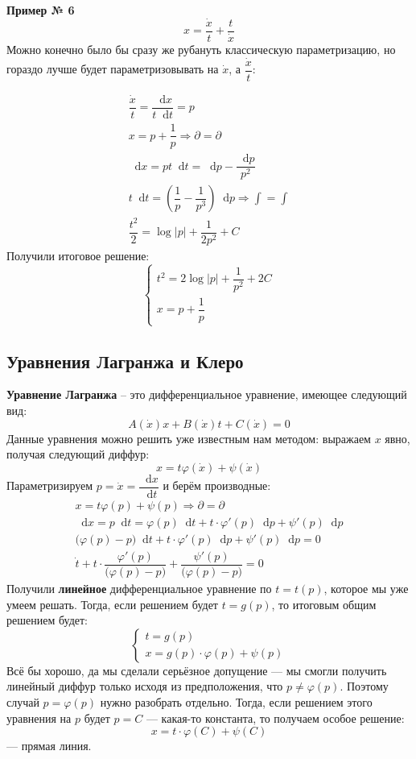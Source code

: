 \documentclass[a4paper,12pt]{article}
\renewcommand*\d{\mathop{}\!\mathrm{d}}
\newcommand{\dt}{\dot{t}}
\newcommand{\dx}{\dot{x}}
\newcommand{\fe}{\varphi}
\newcommand{\bto}{\Longrightarrow}
\newcommand{\ds}{\displaystyle}
\begin{document}
\textbf{Пример № 6}
\[x = \dfrac{\dx}{t} + \dfrac{t}{\dx}\]
Можно конечно было бы сразу же рубануть классическую параметризацию, но гораздо лучше будет параметризовывать на $\dx$, а $\dfrac{\dx }{t}$:

\begin{gather*}
	\dfrac{\dx}{t} = \dfrac{\d x}{t\d t} = p \\
	x = p + \dfrac{1}{p} \bto \partial = \partial\\
	\d x = pt\d t = \d p - \dfrac{\d p}{p^2}\\
	t\d t = \left(\dfrac{1}{p} - \dfrac{1}{p^3}\right)\d p \bto \ds\int = \int\\
	\dfrac{t^2}{2} = \log|p| + \dfrac{1}{2p^2} + C
\end{gather*}
Получили итоговое решение:
\[\begin{cases}t^2 = 2\log|p| + \dfrac{1}{p^2} + 2C\\ x = p + \dfrac{1}{p}\end{cases}\]

\subsection{Уравнения Лагранжа и Клеро}

\textbf{Уравнение Лагранжа} -- это дифференциальное уравнение, имеющее следующий вид:
\[A(\dx)x + B(\dx)t + C(\dx) = 0\]
Данные уравнения можно решить уже известным нам методом: выражаем $x$ явно, получая следующий диффур:
\[x = t \fe(\dx) + \psi(\dx)\]
Параметризируем $p = \dx = \dfrac{\d x}{\d t}$ и берём производные:
\begin{gather*}
x = t\fe(p) + \psi(p) \bto \partial = \partial\\
\d x = p\d t = \fe(p)\d t + t\cdot \fe'(p)\d p + \psi'(p)\d p\\
\big(\fe(p) - p\big)\d t + t \cdot \fe'(p)\d p + \psi'(p)\d p = 0\\
\dt + t \cdot \dfrac{\fe'(p)}{\big(\fe(p) - p\big)} + \dfrac{\psi'(p)}{\big(\fe(p) - p\big)} = 0
\end{gather*}
Получили \textbf{линейное} дифференциальное уравнение по $t = t(p)$, которое мы уже умеем решать. Тогда, если решением будет $t = g(p)$, то итоговым общим решением будет:
\[\begin{cases}
	t = g(p)\\
	x = g(p)\cdot \fe(p) + \psi(p)
\end{cases}\]
Всё бы хорошо, да мы сделали серьёзное допущение --- мы смогли получить линейный диффур только исходя из предположения, что $p \neq \fe(p)$. Поэтому случай $p = \fe(p)$ нужно разобрать отдельно. Тогда, если решением этого уравнения на $p$ будет $p = C$ --- какая-то константа, то получаем особое решение:
\[x = t \cdot \fe(C) + \psi(C)\] --- прямая линия.
\ \\
\end{document}
